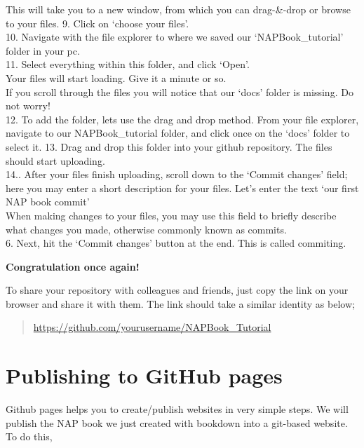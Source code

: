 \documentclass[
]{book}
\begin{document}
This will take you to a new window, from which you can drag-\&-drop or browse to your files.
9. Click on `choose your files'.\\
10. Navigate with the file explorer to where we saved our `NAPBook\_tutorial' folder in your pc.\\
11. Select everything within this folder, and click `Open'.\\
Your files will start loading. Give it a minute or so.\\
If you scroll through the files you will notice that our `docs' folder is missing. Do not worry!\\
12. To add the folder, lets use the drag and drop method. From your file explorer, navigate to our NAPBook\_tutorial folder, and click once on the `docs' folder to select it.
13. Drag and drop this folder into your github repository. The files should start uploading.\\
14.. After your files finish uploading, scroll down to the `Commit changes' field; here you may enter a short description for your files. Let's enter the text `our first NAP book commit'\\
When making changes to your files, you may use this field to briefly describe what changes you made, otherwise commonly known as commits.\\
6. Next, hit the `Commit changes' button at the end. This is called commiting.

\textbf{Congratulation once again!}

To share your repository with colleagues and friends, just copy the link on your browser and share it with them. The link should take a similar identity as below;

\begin{quote}
\url{https://github.com/yourusername/NAPBook_Tutorial}
\end{quote}

\hypertarget{publishing-to-github-pages}{%
\section{Publishing to GitHub pages}\label{publishing-to-github-pages}}

Github pages helps you to create/publish websites in very simple steps.
We will publish the NAP book we just created with bookdown into a git-based website.
To do this,
\end{document}
